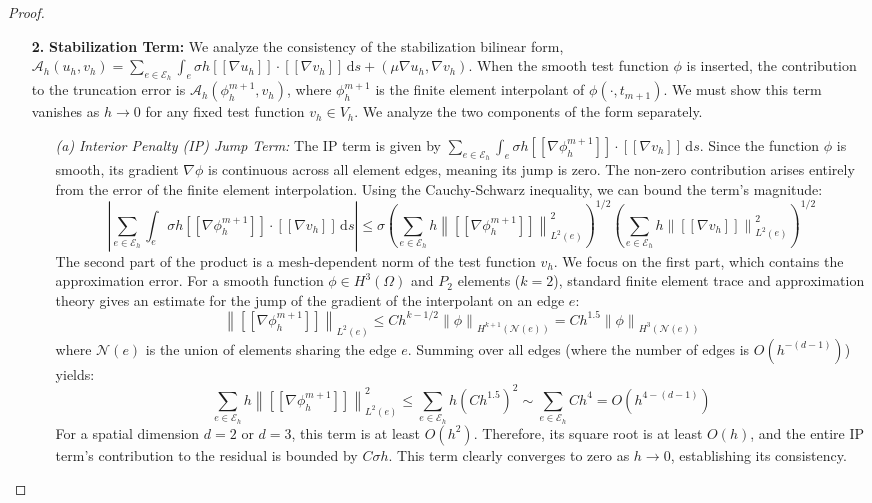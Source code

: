 \documentclass[pdflatex,sn-mathphys-num]{sn-jnl}%
\theoremstyle{thmstyleone}%
\numberwithin{equation}{section}
\newcommand{\norm}[1]{\left\| #1 \right\|}
\begin{document}
\begin{proof}
\begin{enumerate}
    \item[\textbf{2.}] \textbf{Stabilization Term:} We analyze the consistency of the stabilization bilinear form, $\mathcal{A}_h(u_h, v_h) = \sum_{e \in \mathcal{E}_h} \int_e \sigma h [\![ \nabla u_h ]\!] \cdot [\![ \nabla v_h ]\!] \, \mathrm{d}s + (\mu \nabla u_h, \nabla v_h)$. When the smooth test function $\phi$ is inserted, the contribution to the truncation error is $\mathcal{A}_h(\phi_h^{m+1}, v_h)$, where $\phi_h^{m+1}$ is the finite element interpolant of $\phi(\cdot, t_{m+1})$. We must show this term vanishes as $h \to 0$ for any fixed test function $v_h \in V_h$. We analyze the two components of the form separately.

\begin{itemize}
    \item[\emph{(a)}] \emph{Interior Penalty (IP) Jump Term:} The IP term is given by $\sum_{e \in \mathcal{E}_h} \int_e \sigma h [\![ \nabla \phi_h^{m+1} ]\!] \cdot [\![ \nabla v_h ]\!] \, \mathrm{d}s$. Since the function $\phi$ is smooth, its gradient $\nabla \phi$ is continuous across all element edges, meaning its jump is zero. The non-zero contribution arises entirely from the error of the finite element interpolation. Using the Cauchy-Schwarz inequality, we can bound the term's magnitude:
    $$
    \left| \sum_{e \in \mathcal{E}_h} \int_e \sigma h [\![ \nabla \phi_h^{m+1} ]\!] \cdot [\![ \nabla v_h ]\!] \, \mathrm{d}s \right| \le \sigma \left( \sum_{e \in \mathcal{E}_h} h \norm{[\![ \nabla \phi_h^{m+1} ]\!]}_{L^2(e)}^2 \right)^{1/2} \left( \sum_{e \in \mathcal{E}_h} h \norm{[\![ \nabla v_h ]\!]}_{L^2(e)}^2 \right)^{1/2}
    $$
    The second part of the product is a mesh-dependent norm of the test function $v_h$. We focus on the first part, which contains the approximation error. For a smooth function $\phi \in H^3(\Omega)$ and $P_2$ elements ($k=2$), standard finite element trace and approximation theory gives an estimate for the jump of the gradient of the interpolant on an edge $e$:
    $$
    \norm{[\![ \nabla \phi_h^{m+1} ]\!]}_{L^2(e)} \le C h^{k-1/2} \norm{\phi}_{H^{k+1}(\mathcal{N}(e))} = C h^{1.5} \norm{\phi}_{H^3(\mathcal{N}(e))}
    $$
    where $\mathcal{N}(e)$ is the union of elements sharing the edge $e$. Summing over all edges (where the number of edges is $O(h^{-(d-1)})$) yields:
    $$
    \sum_{e \in \mathcal{E}_h} h \norm{[\![ \nabla \phi_h^{m+1} ]\!]}_{L^2(e)}^2 \le \sum_{e \in \mathcal{E}_h} h (C h^{1.5})^2 \sim \sum_{e \in \mathcal{E}_h} C h^4 = O(h^{4-(d-1)})
    $$
    For a spatial dimension $d=2$ or $d=3$, this term is at least $O(h^2)$. Therefore, its square root is at least $O(h)$, and the entire IP term's contribution to the residual is bounded by $C \sigma h$. This term clearly converges to zero as $h \to 0$, establishing its consistency.


\end{itemize}
\end{enumerate}
\end{proof}
\end{document}
